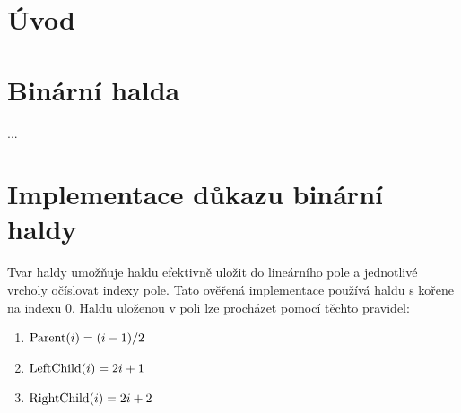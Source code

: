 \chapter*{Úvod}
\setcounter{page}{1}

\begin{chapterabstract}
	\lipsum[1]
\end{chapterabstract}



\chapter{Binární halda}

\begin{definition}
...
\end{definition}


\chapter{Implementace důkazu binární haldy}

Tvar haldy umožňuje haldu efektivně uložit do lineárního pole a jednotlivé vrcholy očíslovat indexy pole. Tato ověřená implementace používá haldu s kořene na indexu $0$. Haldu uloženou v poli lze procházet pomocí těchto pravidel:

\begin{enumerate}
	\item[] $\operatorname{Parent}(i) = (i - 1) / 2$
	\item[] $\operatorname{LeftChild}(i) = 2i + 1$
	\item[] $\operatorname{RightChild}(i) = 2i + 2$
\end{enumerate}


